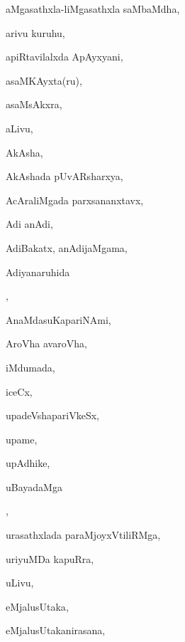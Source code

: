 \noindent
\begin{multicols}{3}
{\small

\noindent
{aMgasathxla-liMgasathxla saMbaMdha}, \pageref{aMgasathxla-liMgasathxla saMbaMdha}

\noindent
{arivu kuruhu}, \pageref{arivu kuruhu}

\noindent
{apiRtavilalxda ApAyxyani}, \pageref{apiRtavilalxda ApAyxyani}

\noindent
{asaMKAyxta(ru)}, \pageref{asaMKAyxta(ru)}

\noindent
{asaMsAkxra}, \pageref{asaMsAkxra}

\noindent
{aLivu}, \pageref{aLivu}

\noindent
{AkAsha}, \pageref{AkAsha}

\noindent
{AkAshada pUvARsharxya}, \pageref{AkAshada pUvARsharxya}

\noindent
{AcAraliMgada parxsananxtavx}, \pageref{AcAraliMgada parxsananxtavx}

\noindent
{Adi anAdi}, \pageref{Adi anAdi}

\noindent
{AdiBakatx, anAdijaMgama}, \pageref{AdiBakatx, anAdijaMgama}

\noindent
{Adiyanaruhida} 

\noindent
{}, \pageref{Adiyanaruhida anAdiya toVridanu}

\noindent
{AnaMdasuKapariNAmi}, \pageref{AnaMdasuKapariNAmi}

\noindent
{AroVha avaroVha}, \pageref{AroVha avaroVha}

\noindent
{iMdumada}, \pageref{iMdumada}

\noindent
{iceCx}, \pageref{iceCx}

\noindent
{upadeVshapariVkeSx}, \pageref{upadeVshapariVkeSx}

\noindent
{upame}, \pageref{upame}

\noindent
{upAdhike}, \pageref{upAdhike}

\noindent
{uBayadaMga}

\noindent
{}, \pageref{uBayadaMga EkiVkaravAguvudu}

\noindent
{urasathxlada paraMjoyxVtiliRMga}, \pageref{urasathxlada paraMjoyxVtiliRMga}

\noindent
{uriyuMDa kapuRra}, \pageref{uriyuMDa kapuRra}

\noindent
{uLivu}, \pageref{uLivu}

\noindent
{eMjalusUtaka}, \pageref{eMjalusUtaka}

\noindent
{eMjalusUtakanirasana}, \pageref{eMjalusUtakanirasana}

}
\end{multicols}
